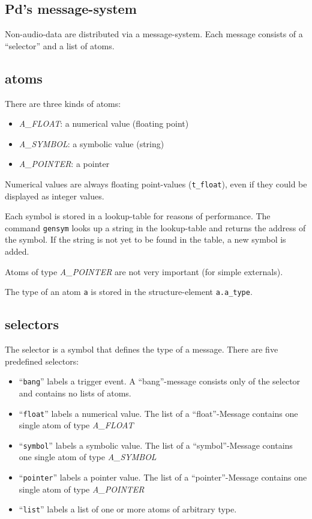 \documentclass[12pt, a4paper,english,titlepage]{article}
\begin{document}
\vfill
\newpage
\begin{appendix}

\section{Pd's message-system}
Non-audio-data are distributed via a message-system.
Each message consists of a ``selector'' and a list of atoms.

\subsection{atoms}

There are three kinds of atoms:
\begin{itemize}
\item {\em A\_FLOAT}: a numerical value (floating point)
\item {\em A\_SYMBOL}: a symbolic value (string)
\item {\em A\_POINTER}: a pointer
\end{itemize}

Numerical values are always floating point-values (\verb+t_float+),
even if they could be displayed as integer values.

Each symbol is stored in a lookup-table for reasons of performance.
The command \verb+gensym+ looks up a string in the lookup-table and
returns the address of the symbol.
If the string is not yet to be found in the table,
a new symbol is added.

Atoms of type {\em A\_POINTER} are not very important (for simple externals). 

The type of an atom \verb+a+ is stored in the structure-element \verb+a.a_type+.

\subsection{selectors}
The selector is a symbol that defines the type of a message.
There are five predefined selectors:
\begin{itemize}
\item ``{\tt bang}'' labels a trigger event.
A ``bang''-message consists only of the selector and contains no lists of atoms.
\item ``{\tt float}'' labels a numerical value.
The list of a ``float''-Message contains one single atom of type {\em A\_FLOAT}
\item ``{\tt symbol}'' labels a symbolic value.
The list of a ``symbol''-Message contains one single atom of type {\em A\_SYMBOL}
\item ``{\tt pointer}'' labels a pointer value.
The list of a ``pointer''-Message contains one single atom of type {\em A\_POINTER}
\item ``{\tt list}'' labels a list of one or more atoms of arbitrary type.
\end{itemize}


\end{appendix}
\end{document}
